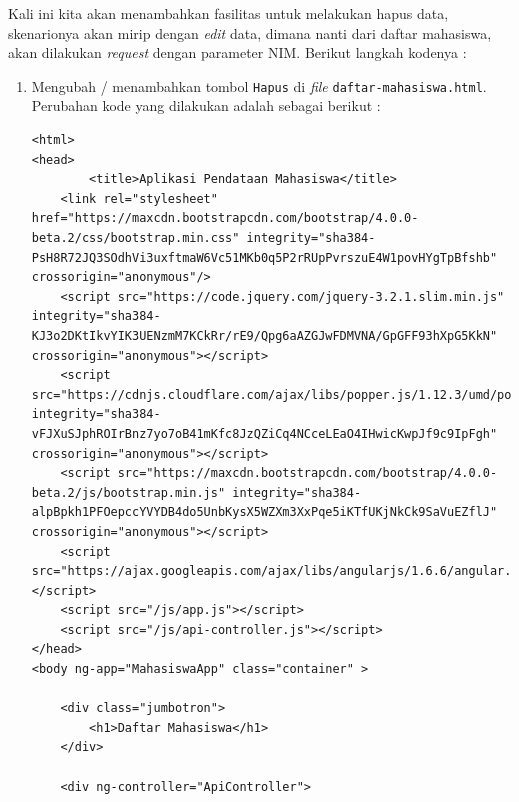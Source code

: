Kali ini kita akan menambahkan fasilitas untuk melakukan hapus data, skenarionya akan mirip dengan \textit{edit} data, dimana nanti dari daftar mahasiswa, akan dilakukan \textit{request} dengan parameter NIM. Berikut langkah kodenya :

\begin{enumerate}
	\item Mengubah / menambahkan tombol \texttt{Hapus} di \textit{file} \texttt{daftar-mahasiswa.html}. Perubahan kode yang dilakukan adalah sebagai berikut :
	
	\begin{lstlisting}
<html>
<head>
        <title>Aplikasi Pendataan Mahasiswa</title>
    <link rel="stylesheet" href="https://maxcdn.bootstrapcdn.com/bootstrap/4.0.0-beta.2/css/bootstrap.min.css" integrity="sha384-PsH8R72JQ3SOdhVi3uxftmaW6Vc51MKb0q5P2rRUpPvrszuE4W1povHYgTpBfshb" crossorigin="anonymous"/>
    <script src="https://code.jquery.com/jquery-3.2.1.slim.min.js" integrity="sha384-KJ3o2DKtIkvYIK3UENzmM7KCkRr/rE9/Qpg6aAZGJwFDMVNA/GpGFF93hXpG5KkN" crossorigin="anonymous"></script>
    <script src="https://cdnjs.cloudflare.com/ajax/libs/popper.js/1.12.3/umd/popper.min.js" integrity="sha384-vFJXuSJphROIrBnz7yo7oB41mKfc8JzQZiCq4NCceLEaO4IHwicKwpJf9c9IpFgh" crossorigin="anonymous"></script>
    <script src="https://maxcdn.bootstrapcdn.com/bootstrap/4.0.0-beta.2/js/bootstrap.min.js" integrity="sha384-alpBpkh1PFOepccYVYDB4do5UnbKysX5WZXm3XxPqe5iKTfUKjNkCk9SaVuEZflJ" crossorigin="anonymous"></script>
    <script src="https://ajax.googleapis.com/ajax/libs/angularjs/1.6.6/angular.min.js"></script>
    <script src="/js/app.js"></script>
    <script src="/js/api-controller.js"></script>
</head>
<body ng-app="MahasiswaApp" class="container" >

    <div class="jumbotron">
        <h1>Daftar Mahasiswa</h1>
    </div>

    <div ng-controller="ApiController">


\end{lstlisting}
\end{enumerate}
